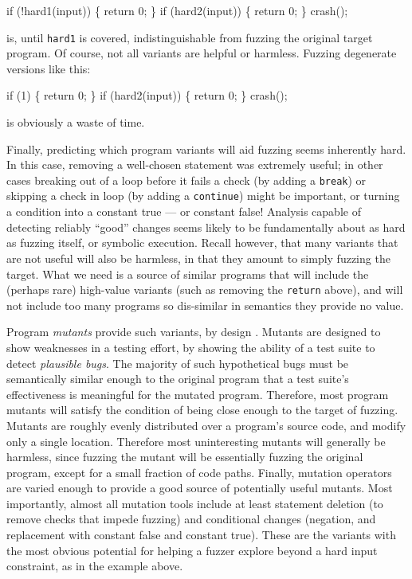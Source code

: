 \begin{code}
  if (!hard1(input)) \{
      return 0;
  \}
  if (hard2(input)) \{
      return 0;
  \}
  crash();
\end{code}

\noindent is, until {\tt hard1} is covered, indistinguishable from fuzzing the original target program.  Of course, not all variants are helpful or harmless.  Fuzzing degenerate versions like this:

\begin{code}
  if (1) \{
      return 0;
  \}
  if (hard2(input)) \{
      return 0;
  \}
  crash();
\end{code}

\noindent is obviously a waste of time.


Finally, predicting which program variants will aid fuzzing seems
inherently hard.  In this case, removing a well-chosen statement was
extremely useful; in other cases breaking out of a loop before it
fails a check (by adding  a {\tt break}) or skipping a check in loop
(by adding a {\tt continue}) might be important, or turning a condition into a constant true --- or constant false!  Analysis capable of detecting reliably ``good'' changes seems likely to be fundamentally about as hard as fuzzing itself, or symbolic execution.  Recall however, that many variants that are not useful will also be harmless, in that they amount to simply fuzzing the target.  What we need is a source of similar programs that will include the (perhaps rare) high-value variants (such as removing the {\tt return} above), and will not include too many programs so dis-similar in semantics they provide no value.

Program \emph{mutants} provide such variants, by design \cite{MutationSurvey}.  Mutants are designed to show weaknesses in a testing effort, by showing
the ability of a test suite to detect \emph{plausible bugs}.  The majority of such hypothetical bugs must be semantically similar enough to
the original program that a test suite's effectiveness is meaningful for the mutated program.  Therefore, most program mutants
will satisfy the condition of being close enough to the target of fuzzing.  Mutants are roughly evenly distributed over a program's source code,
and modify only a single location.  Therefore most uninteresting mutants will generally be harmless, since fuzzing the mutant will be essentially
fuzzing the original program, except for a small fraction of code paths.  Finally, mutation operators are varied enough to provide a good source
of potentially useful mutants.  Most importantly, almost all mutation tools include at least statement deletion (to remove checks that impede
fuzzing) and conditional changes (negation, and replacement with constant false and constant true).  These are the variants with the most
obvious potential for helping a fuzzer explore beyond a hard input constraint, as in the example above.

